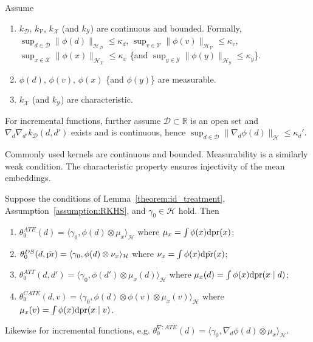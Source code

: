 \begin{assumption}\label{assumption:RKHS}
Assume 
\begin{enumerate}
    \item $k_{\mathcal{D}}$, $k_{\mathcal{V}}$, $k_{\mathcal{X}}$ (and $k_{\mathcal{Y}}$) are continuous and bounded. Formally,
    $
    \sup_{d\in\mathcal{D}}\| \phi(d)\|_{\mathcal{H}_{\mathcal{D}}}\leq \kappa_d$, $ \sup_{v\in\mathcal{V}}\|\phi(v)\|_{\mathcal{H}_{\mathcal{V}}}\leq \kappa_v$, $ \sup_{x\in\mathcal{X}}\|\phi(x)\|_{\mathcal{H}_{\mathcal{X}}}\leq \kappa_x
    $ \{and $ \sup_{y\in\mathcal{Y}}\|\phi(y)\|_{\mathcal{H}_{\mathcal{Y}}}\leq \kappa_y$\}.
    \item $\phi(d)$, $\phi(v)$, $\phi(x)$ \{and $\phi(y)$\} are measurable.
    \item $k_{\mathcal{X}}$ (and $k_{\mathcal{Y}}$) are characteristic.
\end{enumerate}
For incremental functions, further assume $\mathcal{D}\subset \mathbb{R}$ is an open set and $\nabla_d  \nabla_{d'} k_{\mathcal{D}}(d,d')$ exists and is continuous, hence $\sup_{d\in\mathcal{D}}\|\nabla_d\phi(d)\|_{\mathcal{H}}\leq \kappa_d'$.
\end{assumption}
Commonly used kernels are continuous and bounded. Measurability is a similarly weak condition. The characteristic property ensures injectivity of the mean embeddings.

\begin{theorem}\label{theorem:representation_treatment}
Suppose the conditions of Lemma~\ref{theorem:id_treatment}, Assumption~\ref{assumption:RKHS}, and $\gamma_0\in\mathcal{H}$ hold. Then
\begin{enumerate}
    \item $\theta_0^{ATE}(d)=\langle \gamma_0, \phi(d)\otimes \mu_x\rangle_{\mathcal{H}} $ where $\mu_x=\int\phi(x) \mathrm{d}\text{\normalfont pr}(x) $;
    \item $\theta_0^{DS}(d,\tilde{\text{\normalfont pr}})=\langle \gamma_0, \phi(d)\otimes \nu_x\rangle_{\mathcal{H}} $ where $\nu_x=\int\phi(x) \mathrm{d}\tilde{\text{\normalfont pr}}(x) $;
    \item $\theta_0^{ATT}(d,d')=\langle \gamma_0, \phi(d')\otimes \mu_x(d)\rangle_{\mathcal{H}} $ where $\mu_x(d)=\int\phi(x) \mathrm{d}\text{\normalfont pr}(x \mid d)$;
    \item $\theta_0^{CATE}(d,v)=\langle \gamma_0, \phi(d)\otimes \phi(v)\otimes \mu_{x}(v)\rangle_{\mathcal{H}} $ where $\mu_{x}(v)= \int \phi(x) \mathrm{d}\text{\normalfont pr}(x \mid v)$.
\end{enumerate}
Likewise for incremental functions, e.g. $\theta_0^{\nabla:ATE}(d)=\langle \gamma_0, \nabla_d\phi(d)\otimes \mu_x\rangle_{\mathcal{H}} $.
\end{theorem}

